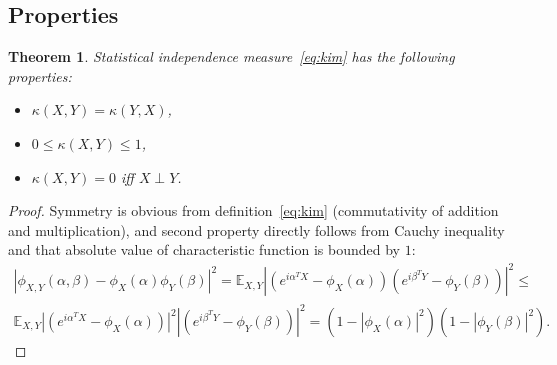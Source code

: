 \documentclass{article}
\newtheorem{theorem}{Theorem}
\begin{document}

\subsection{Properties}
\begin{theorem}
\label{thm:properties}
  Statistical independence measure~\eqref{eq:kim} has the following properties:
  \begin{itemize} 
    \item $\kappa(X,Y) = \kappa(Y,X)$,
    \item $0 \leq \kappa(X,Y) \leq 1$,
    \item $\kappa(X,Y) = 0$ iff $X\perp Y$.
   \end{itemize}    
\end{theorem}


\begin{proof}
Symmetry is obvious from definition~\eqref{eq:kim} (commutativity of addition and multiplication), and second property directly follows from Cauchy inequality and that absolute value of characteristic function is bounded by $1$:
\begin{multline*}
|\phi_{X,Y}(\alpha, \beta)  -\phi_{X}(\alpha) \phi_{Y}(\beta)|^{2} =
\mathbb{E}_{X,Y} |( e^{i\alpha^{T}X} - \phi_{X}(\alpha) )(e^{i\beta^{T}Y}- \phi_{Y}(\beta) )|^{2} \leq \\
\mathbb{E}_{X,Y} |( e^{i\alpha^{T}X} - \phi_{X}(\alpha) )|^{2} |(e^{i\beta^{T}Y}- \phi_{Y}(\beta) )|^{2}  = (1 - |\phi_{X}(\alpha)|^{2}) (1 - |\phi_{Y}(\beta)|^{2}).
\end{multline*}
\end{proof}

\end{document}
